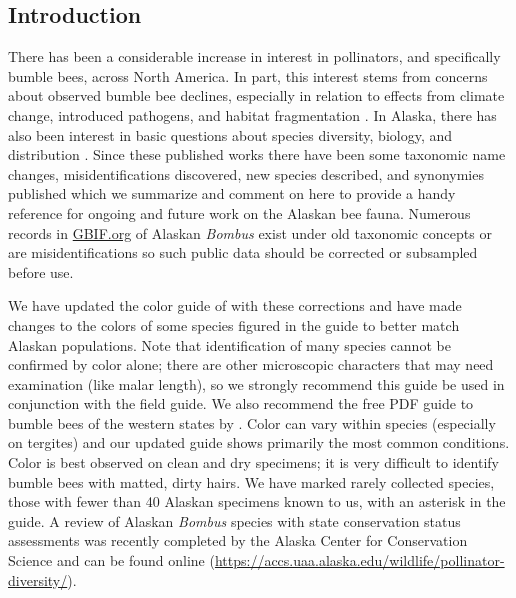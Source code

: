 \begin{multicols}{2}

\section{Introduction}

There has been a considerable increase in interest in pollinators, and specifically bumble bees, across North America. In part, this interest stems from concerns about observed bumble bee declines, especially in relation to effects from climate change, introduced pathogens, and habitat fragmentation \citep{Cameronetal2011, Kerretal2015, Soroyeetal2020}. In Alaska, there has also been interest in basic questions about species diversity, biology, and distribution \citet{KochStrange2012, Kochetal2012, Hattenetal2015, Pampelletal2015, Rykken2015, Rykken2017}. Since these published works there have been some taxonomic name changes, misidentifications discovered, new species described, and synonymies published which we summarize and comment on here to provide a handy reference for ongoing and future work on the Alaskan bee fauna. Numerous records in \href{https://www.gbif.org/}{GBIF.org} of Alaskan \textit{Bombus} exist under old taxonomic concepts or are misidentifications so such public data should be corrected or subsampled before use.

We have updated the color guide of \citet{Pampell2013} with these corrections and have made changes to the colors of some species figured in the guide to better match Alaskan populations. Note that identification of many species cannot be confirmed by color alone; there are other microscopic characters that may need examination (like malar length), so we strongly recommend this guide be used in conjunction with the \citet{Williamsetal2014} field guide. We also recommend the free PDF guide to bumble bees of the western states by \citet{Kochetal2012}. Color can vary within species (especially on tergites) and our updated guide shows primarily the most common conditions. Color is best observed on clean and dry specimens; it is very difficult to identify bumble bees with matted, dirty hairs. We have marked rarely collected species, those with fewer than 40 Alaskan specimens known to us, with an asterisk in the guide. A review of Alaskan \textit{Bombus} species with state conservation status assessments was recently completed by the Alaska Center for Conservation Science and can be found online (\url{https://accs.uaa.alaska.edu/wildlife/pollinator-diversity/}).


\end{multicols}
